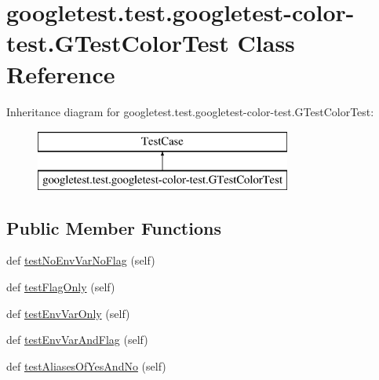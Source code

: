 \hypertarget{classgoogletest_1_1test_1_1googletest-color-test_1_1_g_test_color_test}{}\section{googletest.\+test.\+googletest-\/color-\/test.G\+Test\+Color\+Test Class Reference}
\label{classgoogletest_1_1test_1_1googletest-color-test_1_1_g_test_color_test}
Inheritance diagram for googletest.\+test.\+googletest-\/color-\/test.G\+Test\+Color\+Test\+:\begin{figure}[H]
\begin{center}
\leavevmode
\includegraphics[height=2.000000cm]{d9/d63/classgoogletest_1_1test_1_1googletest-color-test_1_1_g_test_color_test}
\end{center}
\end{figure}
\subsection*{Public Member Functions}
\begin{DoxyCompactItemize}
\item 
def \mbox{\hyperlink{classgoogletest_1_1test_1_1googletest-color-test_1_1_g_test_color_test_acf56f8cd845682e175846b7f755b7621}{test\+No\+Env\+Var\+No\+Flag}} (self)
\item 
def \mbox{\hyperlink{classgoogletest_1_1test_1_1googletest-color-test_1_1_g_test_color_test_ade396d25f41f523ba7debae6b575f39e}{test\+Flag\+Only}} (self)
\item 
def \mbox{\hyperlink{classgoogletest_1_1test_1_1googletest-color-test_1_1_g_test_color_test_aafbe84a366e64e99157cc7c6f6e1e7a6}{test\+Env\+Var\+Only}} (self)
\item 
def \mbox{\hyperlink{classgoogletest_1_1test_1_1googletest-color-test_1_1_g_test_color_test_ab81d91e944b69ecd6f703fc6167287b2}{test\+Env\+Var\+And\+Flag}} (self)
\item 
def \mbox{\hyperlink{classgoogletest_1_1test_1_1googletest-color-test_1_1_g_test_color_test_a02e473e215c9fdef38e633ed1bb9fa05}{test\+Aliases\+Of\+Yes\+And\+No}} (self)
\end{DoxyCompactItemize}


